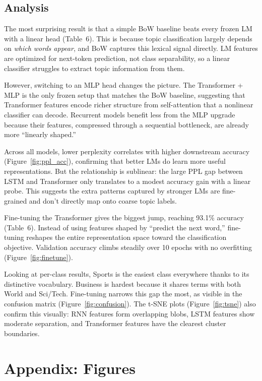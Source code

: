 \documentclass[11pt,a4paper]{article}
\begin{document}
\subsection*{Analysis}

The most surprising result is that a simple BoW baseline beats every frozen LM with a linear head (Table~6). This is because topic classification largely depends on \emph{which words appear}, and BoW captures this lexical signal directly. LM features are optimized for next-token prediction, not class separability, so a linear classifier struggles to extract topic information from them.

However, switching to an MLP head changes the picture. The Transformer + MLP is the only frozen setup that matches the BoW baseline, suggesting that Transformer features encode richer structure from self-attention that a nonlinear classifier can decode. Recurrent models benefit less from the MLP upgrade because their features, compressed through a sequential bottleneck, are already more ``linearly shaped.''

Across all models, lower perplexity correlates with higher downstream accuracy (Figure~\ref{fig:ppl_acc}), confirming that better LMs do learn more useful representations. But the relationship is sublinear: the large PPL gap between LSTM and Transformer only translates to a modest accuracy gain with a linear probe. This suggests the extra patterns captured by stronger LMs are fine-grained and don't directly map onto coarse topic labels.

Fine-tuning the Transformer gives the biggest jump, reaching 93.1\% accuracy (Table~6). Instead of using features shaped by ``predict the next word,'' fine-tuning reshapes the entire representation space toward the classification objective. Validation accuracy climbs steadily over 10 epochs with no overfitting (Figure~\ref{fig:finetune}).

Looking at per-class results, Sports is the easiest class everywhere thanks to its distinctive vocabulary. Business is hardest because it shares terms with both World and Sci/Tech. Fine-tuning narrows this gap the most, as visible in the confusion matrix (Figure~\ref{fig:confusion}). The t-SNE plots (Figure~\ref{fig:tsne}) also confirm this visually: RNN features form overlapping blobs, LSTM features show moderate separation, and Transformer features have the clearest cluster boundaries.

\newpage
\appendix
\section*{Appendix: Figures}
\end{document}

